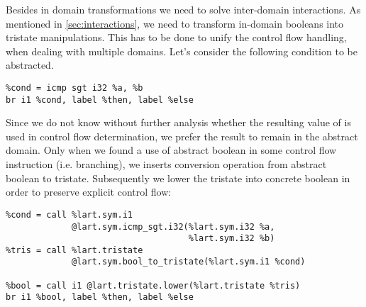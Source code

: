 Besides in domain transformations we need to solve inter-domain interactions. As
mentioned in \autoref{sec:interactions}, we need to transform in-domain booleans
into tristate manipulations. This has to be done to unify the control flow
handling, when dealing with multiple domains. Let's consider the following condition
to be abstracted.
\begin{verbatim}
%cond = icmp sgt i32 %a, %b
br i1 %cond, label %then, label %else
\end{verbatim}
Since we do not know without further analysis whether the resulting value of 
is used in control flow determination, we prefer the result to remain in the
abstract domain. Only when we found a use of abstract boolean in some control flow
instruction (i.e. branching), we inserts conversion operation from abstract
boolean to tristate. Subsequently we lower the tristate into concrete boolean in
order to preserve explicit control flow:
\begin{verbatim}
%cond = call %lart.sym.i1
             @lart.sym.icmp_sgt.i32(%lart.sym.i32 %a,
                                    %lart.sym.i32 %b)
%tris = call %lart.tristate
             @lart.sym.bool_to_tristate(%lart.sym.i1 %cond)

%bool = call i1 @lart.tristate.lower(%lart.tristate %tris)
br i1 %bool, label %then, label %else
\end{verbatim}

